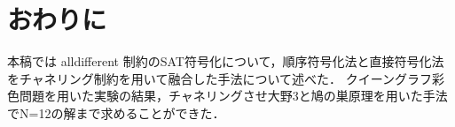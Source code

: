 \section{おわりに}
本稿では alldifferent 制約のSAT符号化について，順序符号化法と直接符号化法をチャネリング制約を用いて融合した手法について述べた．
クイーングラフ彩色問題を用いた実験の結果，チャネリングさせ大野3と鳩の巣原理を用いた手法でN=12の解まで求めることができた．
